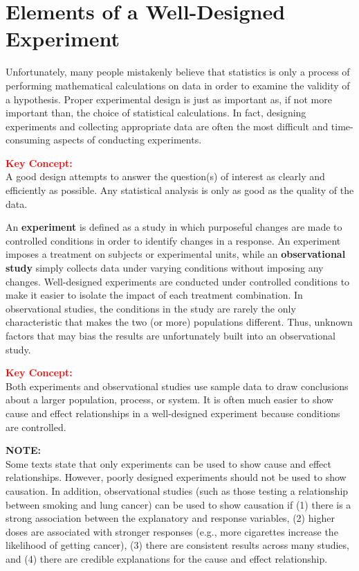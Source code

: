 \documentclass[
]{report}
\begin{document}
\section{\texorpdfstring{\textbf{Elements of a Well-Designed Experiment}}{Elements of a Well-Designed Experiment}}\label{elements-of-a-well-designed-experiment}

Unfortunately, many people mistakenly believe that statistics is only a process of performing mathematical calculations on data in order to examine the validity of a hypothesis. Proper experimental design is just as important as, if not more important than, the choice of statistical calculations. In fact, designing experiments and collecting appropriate data are often the most difficult and time-consuming aspects of conducting experiments.

\large

\textbf{\textcolor{red}{Key Concept:}}\\
\color{red}
A good design attempts to answer the question(s) of interest as clearly and efficiently as possible. Any statistical analysis is only as good as the quality of the data.\\
\color{black}
\normalsize

An \textbf{experiment} is defined as a study in which purposeful changes are made to controlled conditions in order to identify changes in a response. An experiment imposes a treatment on subjects or experimental units, while an \textbf{observational study} simply collects data under varying conditions without imposing any changes. Well-designed experiments are conducted under controlled conditions to make it easier to isolate the impact of each treatment combination. In observational studies, the conditions in the study are rarely the only characteristic that makes the two (or more) populations different. Thus, unknown factors that may bias the results are unfortunately built into an observational study.

\large

\textbf{\textcolor{red}{Key Concept:}}\\
\color{red}
Both experiments and observational studies use sample data to draw conclusions about a larger population, process, or system. It is often much easier to show cause and effect relationships in a well-designed experiment because conditions are controlled.\\
\color{black}
\normalsize

\large

\textbf{NOTE:}\\
Some texts state that only experiments can be used to show cause and effect relationships. However, poorly designed experiments should not be used to show causation. In addition, observational studies (such as those testing a relationship between smoking and lung cancer) can be used to show causation if (1) there is a strong association between the explanatory and response variables, (2) higher doses are associated with stronger responses (e.g., more cigarettes increase the likelihood of getting cancer), (3) there are consistent results across many studies, and (4) there are credible explanations for the cause and effect relationship.\\
\normalsize
\end{document}
